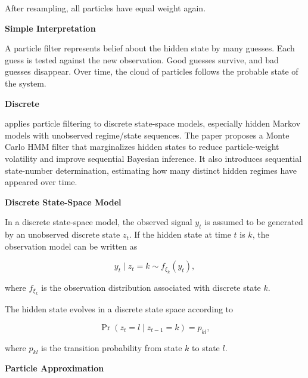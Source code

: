\documentclass{book}
\providecommand{\ProjectDeepHeading}[2]{%
    \par\medskip\noindent\textbf{#2}\par\smallskip
}
\begin{document}
        After resampling, all particles have equal weight again.
    
    
    \ProjectDeepHeading{10}{Simple Interpretation}
        
        A particle filter represents belief about the hidden state by many guesses.
        Each guess is tested against the new observation.
        Good guesses survive, and bad guesses disappear.
        Over time, the cloud of particles follows the probable state of the system.

\ProjectDeepHeading{8}{Discrete}


\cite{chopin-2001-sequential-inference-and-state-number-determination-for-discrete-state-space-models-through-particle-filtering} applies particle filtering to discrete state-space models, especially hidden Markov models with unobserved regime/state sequences. The paper proposes a Monte Carlo HMM filter that marginalizes hidden states to reduce particle-weight volatility and improve sequential Bayesian inference. It also introduces sequential state-number determination, estimating how many distinct hidden regimes have appeared over time.
    
    
    \ProjectDeepHeading{11}{Discrete State-Space Model}
        
        In a discrete state-space model, the observed signal \(y_t\) is assumed to be generated by an unobserved discrete state \(z_t\). If the hidden state at time \(t\) is \(k\), the observation model can be written as
        
        \[
            y_t
            \mid
            z_t = k
            \sim
            f_{\ensuremath{\xi}_k}(y_t),
        \]
        
        where \(f_{\ensuremath{\xi}_k}\) is the observation distribution associated with discrete state \(k\).
        
        The hidden state evolves in a discrete state space according to
        
        \[
            \Pr
            \left(
                z_t = l
                \mid
                z_{t-1} = k
            \right)
            =
            p_{kl},
        \]
        
        where \(p_{kl}\) is the transition probability from state \(k\) to state \(l\).
    
    
    \ProjectDeepHeading{11}{Particle Approximation}
        
\end{document}
